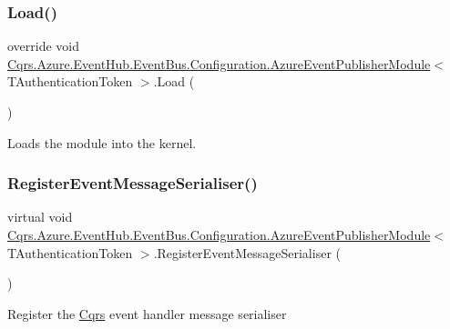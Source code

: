 \subsubsection{\texorpdfstring{Load()}{Load()}}
{\footnotesize\ttfamily override void \hyperlink{classCqrs_1_1Azure_1_1EventHub_1_1EventBus_1_1Configuration_1_1AzureEventPublisherModule}{Cqrs.\+Azure.\+Event\+Hub.\+Event\+Bus.\+Configuration.\+Azure\+Event\+Publisher\+Module}$<$ T\+Authentication\+Token $>$.Load (\begin{DoxyParamCaption}{ }\end{DoxyParamCaption})}



Loads the module into the kernel. 

\mbox{\label{classCqrs_1_1Azure_1_1EventHub_1_1EventBus_1_1Configuration_1_1AzureEventPublisherModule_aa4d57a9b3e15f05ccb6889c517ec24d6_aa4d57a9b3e15f05ccb6889c517ec24d6}} 
\subsubsection{\texorpdfstring{Register\+Event\+Message\+Serialiser()}{RegisterEventMessageSerialiser()}}
{\footnotesize\ttfamily virtual void \hyperlink{classCqrs_1_1Azure_1_1EventHub_1_1EventBus_1_1Configuration_1_1AzureEventPublisherModule}{Cqrs.\+Azure.\+Event\+Hub.\+Event\+Bus.\+Configuration.\+Azure\+Event\+Publisher\+Module}$<$ T\+Authentication\+Token $>$.Register\+Event\+Message\+Serialiser (\begin{DoxyParamCaption}{ }\end{DoxyParamCaption})\hspace{0.3cm}{\ttfamily [virtual]}}



Register the \hyperlink{namespaceCqrs}{Cqrs} event handler message serialiser 

